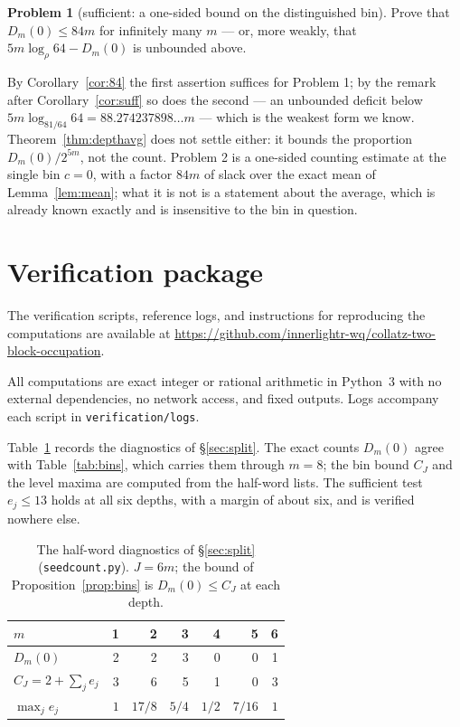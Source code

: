 \documentclass[11pt,a4paper]{article}
\theoremstyle{plain}
\theoremstyle{definition}
\newtheorem{problem}{Problem}
\theoremstyle{remark}
\begin{document}
\begin{problem}[sufficient: a one-sided bound on the distinguished bin]
Prove that $D_m(0)\le 84m$ for infinitely many $m$ --- or, more weakly, that
$5m\log_\rho 64-D_m(0)$ is unbounded above.
\end{problem}

By Corollary~\ref{cor:84} the first assertion suffices for Problem 1; by the
remark after Corollary~\ref{cor:suff} so does the second --- an unbounded
deficit below $5m\log_{81/64}64=88.274237898\ldots m$ --- which is the weakest
form we know. Theorem~\ref{thm:depthavg} does not settle either: it bounds the
proportion $D_m(0)/2^{5m}$, not the count. Problem 2 is a one-sided counting estimate at the single bin
$c=0$, with a factor $84m$ of slack over the exact mean of
Lemma~\ref{lem:mean}; what it is not is a statement about the average, which is
already known exactly and is insensitive to the bin in question.

\appendix
\section{Verification package}\label{app:pkg}

The verification scripts, reference logs, and instructions for reproducing the
computations are available at
\url{https://github.com/innerlightr-wq/collatz-two-block-occupation}.

All computations are exact integer or rational arithmetic in Python~3 with no
external dependencies, no network access, and fixed outputs. Logs accompany
each script in \texttt{verification/logs}.

Table~\ref{tab:split} records the diagnostics of \S\ref{sec:split}. The
exact counts $D_m(0)$ agree with Table~\ref{tab:bins}, which carries them
through $m=8$; the bin bound $C_J$ and the level maxima are computed from the
half-word lists. The sufficient test $e_j\le13$ holds at all six depths, with a
margin of about six, and is verified nowhere else.

\begin{table}[ht]
\centering
\begin{tabular}{lrrrrrr}
\toprule
$m$ & 1 & 2 & 3 & 4 & 5 & 6\\
\midrule
$D_m(0)$ & 2 & 2 & 3 & 0 & 0 & 1\\
$C_J=2+\sum_j e_j$ & 3 & 6 & 5 & 1 & 0 & 3\\
$\max_j e_j$ & $1$ & $17/8$ & $5/4$ & $1/2$ & $7/16$ & $1$\\
\bottomrule
\end{tabular}
\caption{The half-word diagnostics of \S\ref{sec:split}
(\texttt{seedcount.py}). $J=6m$; the bound of Proposition~\ref{prop:bins} is
$D_m(0)\le C_J$ at each depth.}
\label{tab:split}
\end{table}
\end{document}
